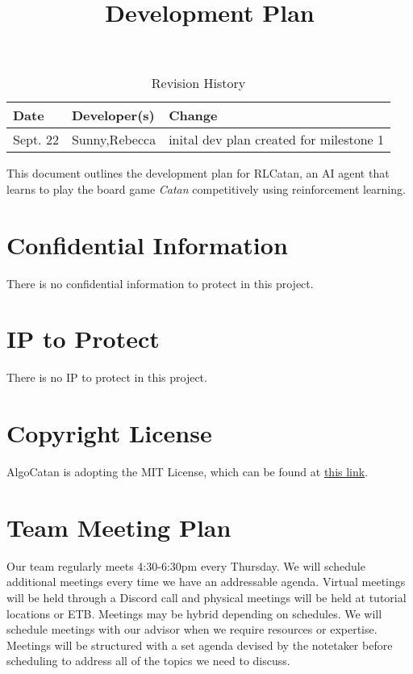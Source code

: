 \documentclass{article}
\title{Development Plan\\\progname}
\author{\authname}
\date{}
\begin{document}
\maketitle

\begin{table}[hp]
\caption{Revision History} \label{TblRevisionHistory}
\begin{tabularx}{\textwidth}{llX}
\toprule
\textbf{Date} & \textbf{Developer(s)} & \textbf{Change}\\
\midrule
Sept. 22 & Sunny,Rebecca & inital dev plan created for milestone 1\\
\bottomrule
\end{tabularx}
\end{table}

\newpage{}

\raggedright
This document outlines the development plan for RLCatan, an
AI agent that learns to play the board game \emph{Catan} competitively 
using reinforcement learning. 

\section{Confidential Information}

\raggedright
There is no confidential information to protect in this project.

\section{IP to Protect}

\raggedright
There is no IP to protect in this project.

\section{Copyright License}

\raggedright{AlgoCatan is adopting the MIT License, which can be found at \href{https://github.com/SY3141/RLCatan/blob/main/LICENSE}{this link}.}



\section{Team Meeting Plan}

\raggedright
Our team regularly meets 4:30-6:30pm every Thursday.
We will schedule additional meetings every time we have an addressable 
agenda. Virtual meetings will be held through a Discord call 
and physical meetings will be held at tutorial locations or ETB.
 Meetings may be hybrid depending on schedules. We will schedule
  meetings with our advisor when we require resources or 
  expertise. Meetings will be structured with a set agenda devised by the notetaker
  before scheduling to address all of the topics we need to discuss.
\end{document}
